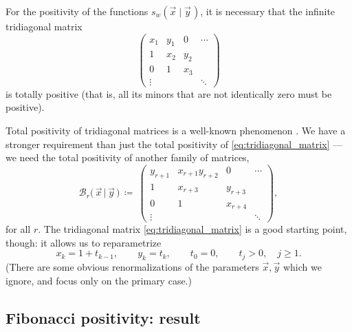 \documentclass[letterpaper,11pt,oneside,reqno]{article}
\numberwithin{equation}{section}
\newcommand{\ssp}{\hspace{1pt}}
\theoremstyle{definition}
\begin{document}
For the positivity of the functions
$s_w(\vec{x} \mid \vec{y}\ssp)$, it is necessary that the
infinite
tridiagonal matrix
\begin{equation}
	\label{eq:tridiagonal_matrix}
	\begin{pmatrix}
	x_1 & y_1 & 0 & \cdots\\
	1 & x_2 & y_2 &\\
	0 & 1 & x_3  & \\
	\vdots & & & \ddots
	\end{pmatrix}
\end{equation}
is totally positive (that is, all its minors that are not
identically zero must be positive).

Total positivity of tridiagonal matrices is a well-known phenomenon
\cite{FominZelevinsky1999}.
We have a stronger requirement than just the total positivity
of \eqref{eq:tridiagonal_matrix} --- we need the total positivity of
another family of matrices,
\begin{equation*}
		\mathcal{B}_r \big( \, \vec{x} \, \big| \, \vec{y} \, \big) \, \coloneqq \
		\begin{pmatrix}
		y_{r+1} & x_{r+1} y_{r+2} & 0 & \cdots\\
		1 & x_{r+3} & y_{r+3} &\\
		0 & 1 & x_{r+4}  & \\
		\vdots & & & \ddots
	\end{pmatrix},
\end{equation*}
for all $r$. The tridiagonal matrix \eqref{eq:tridiagonal_matrix} is a good starting point,
though: it allows us to reparametrize
\begin{equation*}
	x_k=1+t_{k-1},\qquad y_k=t_k,\qquad t_0=0, \qquad t_j>0, \quad j\ge 1.
\end{equation*}
(There are some obvious renormalizations of the parameters
$\vec x,\vec y$
which we ignore, and
focus only on the primary case.)

\subsection{Fibonacci positivity: result}
\end{document}
